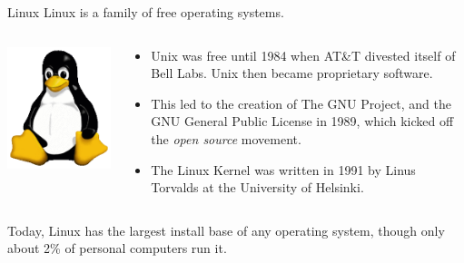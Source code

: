 \documentclass[11pt]{beamer}
\begin{document}
\begin{frame}{Linux}
Linux is a family of free operating systems.
\begin{columns}
\begin{column}{0.25\textwidth}
\includegraphics[scale=0.4]{Tux.png}
\end{column}
\begin{column}{0.73\textwidth}
\begin{itemize}
\item Unix was free until 1984 when AT\&T divested itself of Bell Labs.  Unix then became proprietary software. 
\item This led to the creation of The GNU Project, and the GNU General Public License in 1989, which kicked off the \emph{open source} movement.  
\item The Linux Kernel was written in 1991 by Linus Torvalds at the University of Helsinki.
\end{itemize}
\end{column}
\end{columns}
\vspace{0.5em}
Today, Linux has the largest install base of any operating system, though only about 2\% of personal computers run it. 
\end{frame}
\end{document}
